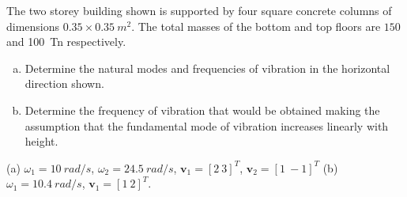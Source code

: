
\begin{Exercise}[label={two_storey}]
The two storey building shown is supported by four square concrete columns of dimensions $0.35 \times \SI{0.35}{m^2}$. The total masses of the bottom and top floors are $150$ and \SI{100}{Tn} respectively.
\begin{enumerate}[(a)]
    \item Determine the natural modes and frequencies of vibration in the horizontal direction shown.
    \item Determine the frequency of vibration that would be obtained making the assumption that the fundamental mode of vibration increases linearly with height.
\end{enumerate}

\begin{center}
\end{center}

\shortAnswer (a) $\omega_1=\SI{10}{rad/s}$, $\omega_2=\SI{24.5}{rad/s}$, $\mathbf{v}_1 = [2\ 3]^T$, $\mathbf{v}_2 = [1\ {-}1]^T$
(b) $\omega_1=\SI{10.4}{rad/s}$, $\mathbf{v}_1 = [1\ 2]^T$.
\end{Exercise}



